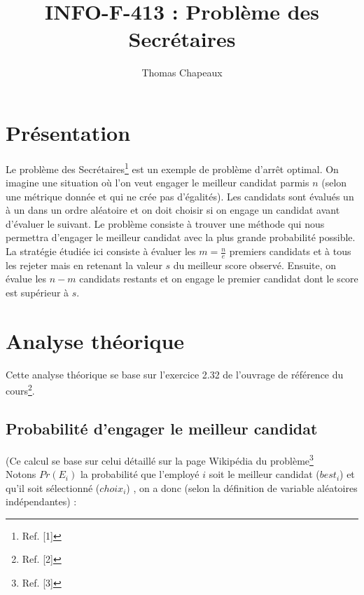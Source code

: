 \documentclass[a4paper,10pt]{article}
\title{INFO-F-413 : Problème des Secrétaires}
\author{Thomas Chapeaux}
\begin{document}
\sloppy
\maketitle

\section{Présentation}

Le problème des Secrétaires\footnote{Ref. [1]} est un exemple de problème d'arrêt optimal. On imagine une situation où l'on veut engager
le meilleur candidat parmis
\begin{math}n\end{math}
(selon une métrique donnée et qui ne crée pas d'égalités). Les candidats sont évalués un à un dans un ordre aléatoire et on doit choisir si on engage un candidat
avant d'évaluer le suivant. Le problème consiste à trouver une méthode qui nous permettra d'engager le meilleur candidat avec
la plus grande probabilité possible.\\

La stratégie étudiée ici consiste à évaluer les
\begin{math}m = \frac{n}{e}\end{math}
premiers candidats et à tous les rejeter mais en retenant la valeur
\begin{math}s\end{math}
du meilleur score observé. Ensuite, on évalue les
\begin{math}n-m\end{math}
candidats restants et on engage le premier candidat dont le score est supérieur à
\begin{math}s\end{math}.\\

\section{Analyse théorique}
Cette analyse théorique se base sur l'exercice 2.32 de l'ouvrage de référence du cours\footnote{Ref. [2]}.
\subsection{Probabilité d'engager le meilleur candidat}
(Ce calcul se base sur celui détaillé sur la page Wikipédia du problème\footnote{Ref. [3]}\\

Notons
\begin{math}Pr(E_i)\end{math}
la probabilité que l'employé
\begin{math}i\end{math}
soit le meilleur candidat
(\begin{math}best_i\end{math})
et qu'il soit sélectionné
(\begin{math}choix_i\end{math})
, on a donc (selon la définition de variable aléatoires indépendantes) :\\
\end{document}
